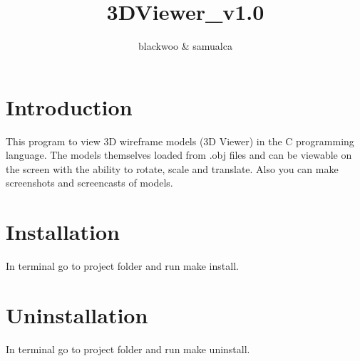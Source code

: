 \documentclass{article}
\title{3DViewer_v1.0}
\author{blackwoo & samualca}
\begin{document}
\maketitle

\section{Introduction}

This program to view 3D wireframe models (3D Viewer) in the C programming language. The models themselves loaded from .obj files and can be viewable on the screen with the ability to rotate, scale and translate. Also you can make screenshots and screencasts of models.

\section{Installation}

In terminal go to project folder and run make install.

\section{Uninstallation}

In terminal go to project folder and run make uninstall.
\end{document}
